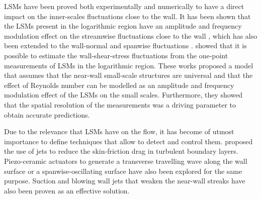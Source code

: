 LSMs have been proved both experimentally \citep{hutchins2007large, mathis2009large} and numerically \citep{hoyas2006scaling,hoyas2008reynolds} to have a direct impact on the inner-scales fluctuations close to the wall.
It has been shown that the LSMs present in the logarithmic region have an amplitude and frequency modulation effect on the streamwise fluctuations close to the wall \citep{marusic2010predictive,mathis2011predictive}, which has also been extended to the wall-normal and spanwise fluctuations \citep{ganapathisubramani2012amplitude}.
\citet{mathis2013estimating} showed that it is possible to estimate the wall-shear-stress fluctuations from the one-point measurements of LSMs in the logarithmic region.
These works \citep{marusic2010predictive,mathis2011predictive,ganapathisubramani2012amplitude,mathis2013estimating} proposed a model that assumes that the near-wall small-scale structures are universal\citep{jimenez1999autonomous} and that the effect of Reynolds number can be modelled as an amplitude and frequency modulation effect of the LSMs on the small scales.
Furthermore, they showed that the spatial resolution of the measurements was a driving parameter to obtain accurate predictions.

Due to the relevance that LSMs have on the flow, it has become of utmost importance to define techniques that allow to detect and control them.
\citet{abbassi2017skin} proposed the use of jets to reduce the skin-friction drag in turbulent boundary layers.
Piezo-ceramic actuators to generate a transverse travelling wave along the wall surface \citep{bai2014active} or a spanwise-oscillating surface \citep{gouder2013turbulent} have also been explored for the same purpose.
Suction and blowing wall jets that weaken the near-wall streaks \citep{lee1997application} have also been proven as an effective solution.

